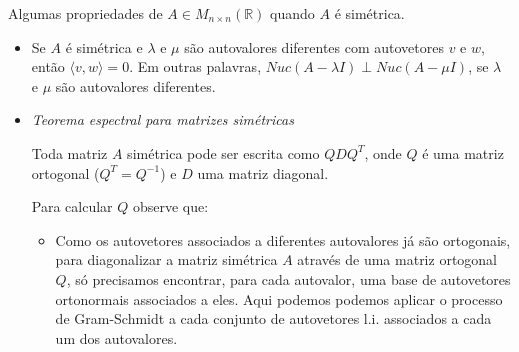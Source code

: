 \documentclass[10pt]{article}
\theoremstyle{plain}
\theoremstyle{obs}
\numberwithin{equation}{section}
\begin{document}
 Algumas propriedades de $A \in M_{n \times n}(\mathbb{R})$ quando $A$ é simétrica.
 \begin{itemize}
  \item Se $A$ é simétrica e $\lambda$ e $\mu$ são autovalores diferentes com autovetores $v$ e $w$, 
  então $\langle v, w\rangle=0$. 
  Em outras palavras, 
  $Nuc(A-\lambda I) \perp Nuc(A-\mu I)$, se $\lambda$ e $\mu$ são autovalores diferentes.
  
  \item {\it Teorema espectral para matrizes simétricas}
  
  Toda matriz $A$ simétrica pode ser escrita como $QDQ^{T}$, onde $Q$
  é uma matriz ortogonal ($Q^{T}=Q^{-1}$) e $D$ uma matriz diagonal. \newline
   
  Para calcular $Q$ observe que: 
   \begin{itemize}
    \item 
  Como os autovetores associados a diferentes autovalores já são ortogonais, 
  para diagonalizar a matriz simétrica $A$ através de uma matriz ortogonal $Q$, 
  só precisamos encontrar, para cada autovalor, uma base de autovetores ortonormais associados a eles. 
  Aqui podemos podemos aplicar o processo de Gram-Schmidt a cada conjunto de autovetores l.i. associados a cada um 
  dos autovalores.
   \end{itemize}
 \end{itemize}
 
\end{document}
